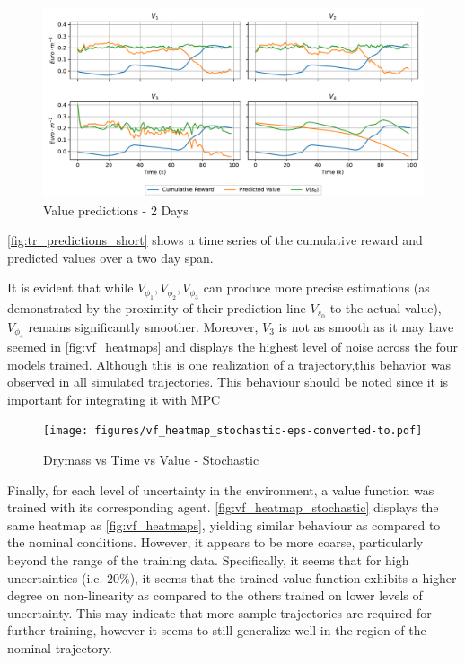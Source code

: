 \begin{figure}[H]
	\centering
	\includegraphics[width = \textwidth]{figures/vf_time_predictions_short-eps-converted-to.pdf}
	\caption{Value predictions - 2 Days}
	\label{fig:tr_predictions_short}
\end{figure}

	


\autoref{fig:tr_predictions_short} shows a time series of the cumulative reward and predicted values over a two day span. 

\begin{remark}\label{rem:vf-smoothness}
	It is evident that while $V_{\phi_1}, V_{\phi_2}, V_{\phi_3}$ can produce more precise estimations (as demonstrated by the proximity of their prediction line $V_{s_0}$ to the actual value), $V_{\phi_4}$ remains significantly smoother. Moreover, $V_3$ is not as smooth as it may have seemed in \autoref{fig:vf_heatmaps} and displays the highest level of noise across the four models trained. Although this is one realization of a trajectory,this behavior was observed in all simulated trajectories. This behaviour should be noted since it is important for integrating it with MPC
\end{remark}



\begin{figure}[H]
	\centering
	\texttt{[image: figures/vf\_heatmap\_stochastic-eps-converted-to.pdf]}
	\caption{Drymass vs Time vs Value - Stochastic}
	\label{fig:vf_heatmap_stochastic}
\end{figure}
Finally, for each level of uncertainty in the environment, a value function was trained with its corresponding agent. \autoref{fig:vf_heatmap_stochastic} displays the same heatmap as \autoref{fig:vf_heatmaps}, yielding similar behaviour as compared to the nominal conditions. However, it appears to be more coarse, particularly beyond the range of the training data. Specifically, it seems that for high uncertainties (i.e. $20\%$), it seems that the trained value function exhibits a higher degree on non-linearity as compared to the others trained on lower levels of uncertainty. This may indicate that more sample trajectories are required for further training, however it seems to still generalize well in the region of the nominal trajectory.


